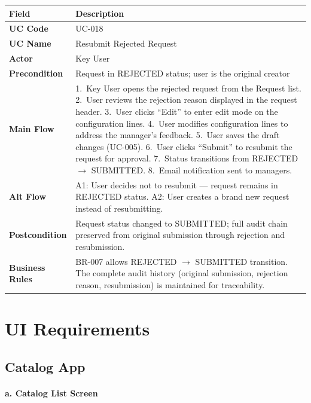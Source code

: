 \documentclass[12pt,a4paper]{report}
\begin{document}
\begin{longtable}{|>{\bfseries}p{2.8cm}|p{12cm}|}
  \hline
  \rowcolor{tableheadpeach}
  \textbf{Field} & \textbf{Description} \\ \hline
  \endhead \hline \endfoot
  UC Code       & UC-018 \\ \hline
  UC Name       & Resubmit Rejected Request \\ \hline
  Actor         & Key User \\ \hline
  Precondition  & Request in REJECTED status; user is the original creator \\ \hline
  Main Flow     & 1.~Key User opens the rejected request from the Request list.
                  2.~User reviews the rejection reason displayed in the request header.
                  3.~User clicks ``Edit'' to enter edit mode on the configuration lines.
                  4.~User modifies configuration lines to address the manager's feedback.
                  5.~User saves the draft changes (UC-005).
                  6.~User clicks ``Submit'' to resubmit the request for approval.
                  7.~Status transitions from REJECTED $\rightarrow$ SUBMITTED.
                  8.~Email notification sent to managers. \\ \hline
  Alt Flow      & A1: User decides not to resubmit --- request remains in REJECTED status.
                  A2: User creates a brand new request instead of resubmitting. \\ \hline
  Postcondition & Request status changed to SUBMITTED; full audit chain preserved from original submission through rejection and resubmission. \\ \hline
  Business Rules& BR-007 allows REJECTED $\rightarrow$ SUBMITTED transition. The complete audit history (original submission, rejection reason, resubmission) is maintained for traceability. \\ \hline
\end{longtable}


\section{UI Requirements}

\subsection{Catalog App}

\paragraph{a. Catalog List Screen}
\end{document}
